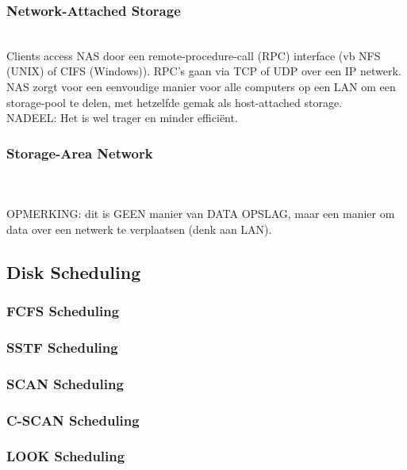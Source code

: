 \subsubsection{Network-Attached Storage}
 \\ Clients access NAS door een remote-procedure-call (RPC) interface (vb NFS (UNIX) of CIFS (Windows)). RPC's gaan via TCP of UDP over een IP netwerk. \\ NAS zorgt voor een eenvoudige manier voor alle computers op een LAN om een storage-pool te delen, met hetzelfde gemak als host-attached storage. \\ NADEEL: Het is wel trager en minder effici\"{e}nt.
\subsubsection{Storage-Area Network}
 \\ \hfill \\OPMERKING: dit is GEEN manier van DATA OPSLAG, maar een manier om data over een netwerk te verplaatsen (denk aan LAN).
\subsection{Disk Scheduling}
\subsubsection{FCFS Scheduling}

\subsubsection{SSTF Scheduling}
\subsubsection{SCAN Scheduling}
\subsubsection{C-SCAN Scheduling}
\subsubsection{LOOK Scheduling}
